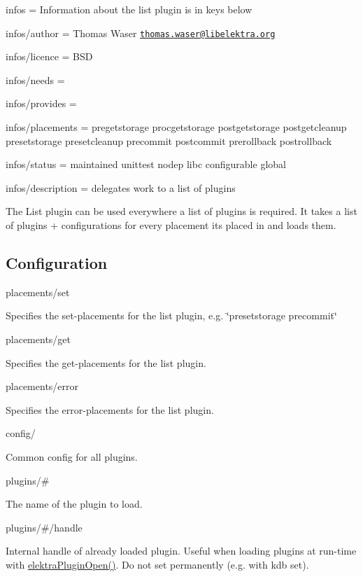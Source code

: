 
\begin{DoxyItemize}
\item infos = Information about the list plugin is in keys below
\item infos/author = Thomas Waser \href{mailto:thomas.waser@libelektra.org}{\tt thomas.\+waser@libelektra.\+org}
\item infos/licence = B\+SD
\item infos/needs =
\item infos/provides =
\item infos/placements = pregetstorage procgetstorage postgetstorage postgetcleanup presetstorage presetcleanup precommit postcommit prerollback postrollback
\item infos/status = maintained unittest nodep libc configurable global
\item infos/description = delegates work to a list of plugins
\end{DoxyItemize}

The List plugin can be used everywhere a list of plugins is required. It takes a list of plugins + configurations for every placement it\textquotesingle{}s placed in and loads them.

\subsection*{Configuration}

{\ttfamily placements/set}

Specifies the set-\/placements for the list plugin, e.\+g. \char`\"{}presetstorage precommit\char`\"{}

{\ttfamily placements/get}

Specifies the get-\/placements for the list plugin.

{\ttfamily placements/error}

Specifies the error-\/placements for the list plugin.

{\ttfamily config/}

Common config for all plugins.

{\ttfamily plugins/\#}

The name of the plugin to load.

{\ttfamily plugins/\#/handle}

Internal handle of already loaded plugin. Useful when loading plugins at run-\/time with {\ttfamily \hyperlink{elektra_2plugin_8c_a32a70a7876542c51d153164ac5108a57}{elektra\+Plugin\+Open()}}. Do not set permanently (e.\+g. with {\ttfamily kdb set}).

